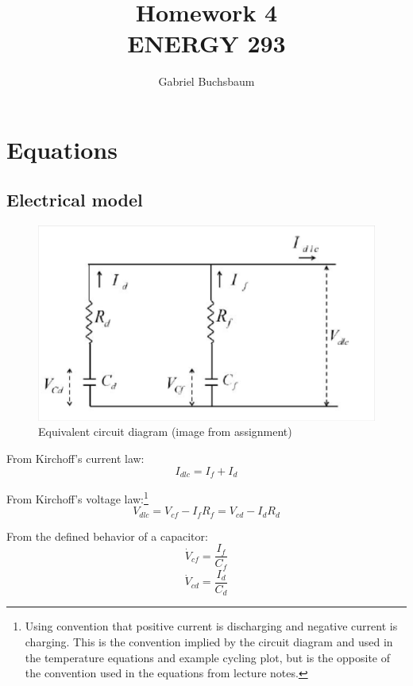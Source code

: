 \documentclass[fleqn]{article}
\title{Homework 4\\ENERGY 293}
\author{Gabriel Buchsbaum}
\begin{document}
\lstset{language=Matlab}

\maketitle

\section{Equations}

\subsection{Electrical model}

\begin{figure}[htb]
\begin{center}
\includegraphics[width=0.75\linewidth]{circuit.png}
\caption{Equivalent circuit diagram (image from assignment)}
\label{fig:circuit}
\end{center}
\end{figure}

From Kirchoff's current law:
\begin{equation}
I_{dlc} = I_f + I_d
\label{eqn:kcl}
\end{equation}

From Kirchoff's voltage law:\footnote{Using convention that positive current is discharging and negative current is charging. This is the convention implied by the circuit diagram and used in the temperature equations and example cycling plot, but is the opposite of the convention used in the equations from lecture notes.}
\begin{equation}
V_{dlc} = V_{cf} - I_f R_f = V_{cd} - I_d R_d
\label{eqn:kvl}
\end{equation}

From the defined behavior of a capacitor:
\begin{equation}
\dot{V}_{cf} = \frac{I_f}{C_f}
\label{eqn:dVcf}
\end{equation}
\begin{equation}
\dot{V}_{cd} = \frac{I_d}{C_d}
\label{eqn:dVcd}
\end{equation}
\end{document}
